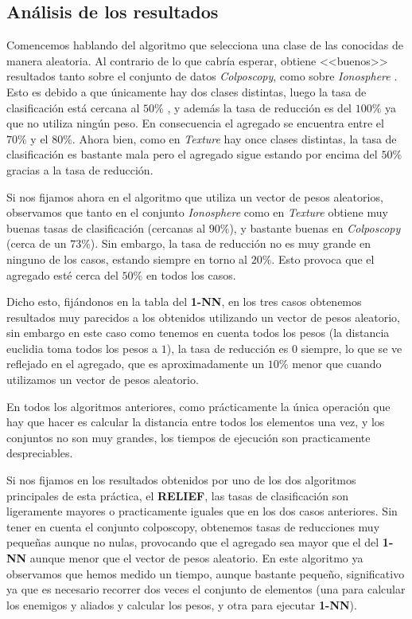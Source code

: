 \documentclass[size=a4, parskip=half, titlepage=false, toc=flat, toc=bib, 12pt]{scrartcl}
\begin{document}
\newpage

\subsection{Análisis de los resultados}

Comencemos hablando del algoritmo que selecciona una clase de las conocidas de manera aleatoria. Al contrario de lo que cabría esperar, obtiene <<buenos>> resultados tanto sobre el conjunto de datos \textit{Colposcopy}, como sobre \textit{Ionosphere} . Esto es debido a que únicamente hay dos clases distintas, luego la tasa de clasificación está cercana al $50\%$ , y además la tasa de reducción es del $100\%$ ya que no utiliza ningún peso. En consecuencia el agregado se encuentra entre el $70\%$ y el $80\%$. Ahora bien, como en \textit{Texture} hay once clases distintas, la tasa de clasificación es bastante mala pero el agregado sigue estando por encima del $50\%$ gracias a la tasa de reducción.

Si nos fijamos ahora en el algoritmo que utiliza un vector de pesos aleatorios, observamos que tanto en el conjunto \textit{Ionosphere} como en \textit{Texture} obtiene muy buenas tasas de clasificación (cercanas al $90\%$), y bastante buenas en \textit{Colposcopy} (cerca de un $73\%$). Sin embargo, la tasa de reducción no es muy grande en ninguno de los casos, estando siempre en torno al $20\%$. Esto provoca que el agregado esté cerca del $50\%$ en todos los casos.

Dicho esto, fijándonos en la tabla del \textbf{1-NN}, en los tres casos obtenemos resultados muy parecidos a los obtenidos utilizando un vector de pesos aleatorio, sin embargo en este caso como tenemos en cuenta todos los pesos (la distancia euclidia toma todos los pesos a $1$), la tasa de reducción es $0$ siempre, lo que se ve reflejado en el agregado, que es aproximadamente un $10\%$ menor que cuando utilizamos un vector de pesos aleatorio.

En todos los algoritmos anteriores, como prácticamente la única operación que hay que hacer es calcular la distancia entre todos los elementos una vez, y los conjuntos no son muy grandes, los tiempos de ejecución son practicamente despreciables.

Si nos fijamos en los resultados obtenidos por uno de los dos algoritmos principales de esta práctica, el \textbf{RELIEF}, las tasas de clasificación son ligeramente mayores o practicamente iguales que en los dos casos anteriores. Sin tener en cuenta el conjunto colposcopy, obtenemos tasas de reducciones muy pequeñas aunque no nulas, provocando que el agregado sea mayor que el del \textbf{1-NN} aunque menor que el vector de pesos aleatorio. En este algoritmo ya observamos que hemos medido un tiempo, aunque bastante pequeño, significativo ya que es necesario recorrer dos veces el conjunto de elementos (una para calcular los enemigos y aliados y calcular los pesos, y otra para ejecutar \textbf{1-NN}).
\end{document}
